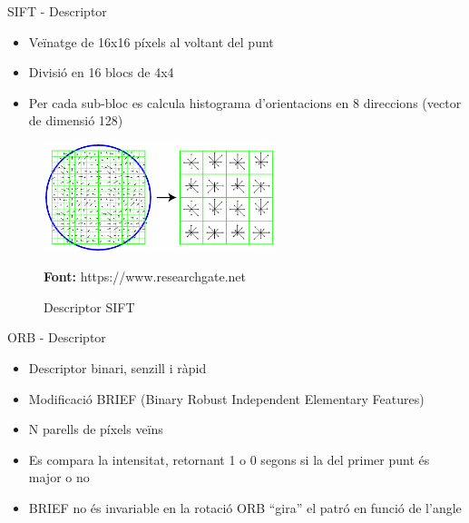 \documentclass[xcolor=table, 11pt]{beamer}
\newcommand*{\captionsource}[2]{%
  \caption[{#1}]{#1}\par
  \vspace{-0.4cm}
  \tiny{\textbf{Font:} #2\par}}
\newcommand\tz{\fontsize{13}{15.6}\selectfont}
\begin{document}
	\begin{frame}{SIFT - Descriptor}
		\tz
		\begin{itemize}
			\item Veïnatge de 16x16 píxels al voltant del punt
			\item Divisió en 16 blocs de 4x4
			\item Per cada sub-bloc es calcula histograma d'orientacions en 8 direccions (vector de dimensió 128)
		\end{itemize}
		\begin{figure}[H]
			\centering
			\includegraphics[width=0.6\textwidth]{images/sift-des}
			\captionsource{Descriptor SIFT}{https://www.researchgate.net}
		\end{figure}
	\end{frame}

	\begin{frame}{ORB - Descriptor}
		\tz
		\begin{itemize}
			\item Descriptor binari, senzill i ràpid
			\item Modificació BRIEF\cite{Calonder:2010:BBR:1888089.1888148} (Binary Robust Independent Elementary Features)
			\item N parells de píxels veïns
			\item Es compara la intensitat, retornant 1 o 0 segons si la del primer punt és major o no
			\item \alert{BRIEF no és invariable en la rotació} \textrightarrow{} ORB ``gira'' el patró en funció de l'angle
		\end{itemize}
	\end{frame}
\end{document}
